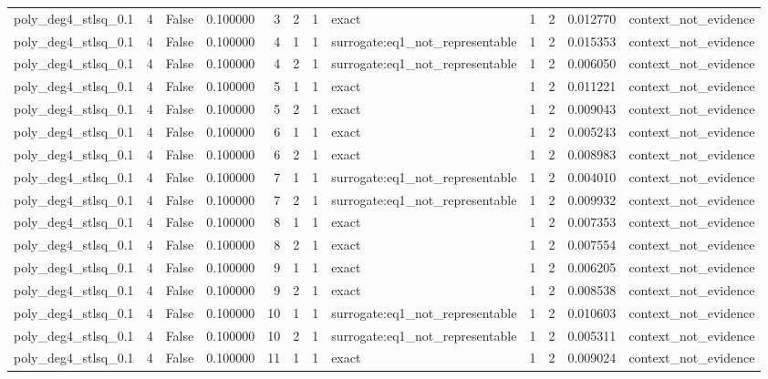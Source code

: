 \begin{tabular}{lrrrrrrlrrrl}
poly\_deg4\_stlsq\_0.1 & 4 & False & 0.100000 & 3 & 2 & 1 & exact & 1 & 2 & 0.012770 & context\_not\_evidence \\
poly\_deg4\_stlsq\_0.1 & 4 & False & 0.100000 & 4 & 1 & 1 & surrogate:eq1\_not\_representable & 1 & 2 & 0.015353 & context\_not\_evidence \\
poly\_deg4\_stlsq\_0.1 & 4 & False & 0.100000 & 4 & 2 & 1 & surrogate:eq1\_not\_representable & 1 & 2 & 0.006050 & context\_not\_evidence \\
poly\_deg4\_stlsq\_0.1 & 4 & False & 0.100000 & 5 & 1 & 1 & exact & 1 & 2 & 0.011221 & context\_not\_evidence \\
poly\_deg4\_stlsq\_0.1 & 4 & False & 0.100000 & 5 & 2 & 1 & exact & 1 & 2 & 0.009043 & context\_not\_evidence \\
poly\_deg4\_stlsq\_0.1 & 4 & False & 0.100000 & 6 & 1 & 1 & exact & 1 & 2 & 0.005243 & context\_not\_evidence \\
poly\_deg4\_stlsq\_0.1 & 4 & False & 0.100000 & 6 & 2 & 1 & exact & 1 & 2 & 0.008983 & context\_not\_evidence \\
poly\_deg4\_stlsq\_0.1 & 4 & False & 0.100000 & 7 & 1 & 1 & surrogate:eq1\_not\_representable & 1 & 2 & 0.004010 & context\_not\_evidence \\
poly\_deg4\_stlsq\_0.1 & 4 & False & 0.100000 & 7 & 2 & 1 & surrogate:eq1\_not\_representable & 1 & 2 & 0.009932 & context\_not\_evidence \\
poly\_deg4\_stlsq\_0.1 & 4 & False & 0.100000 & 8 & 1 & 1 & exact & 1 & 2 & 0.007353 & context\_not\_evidence \\
poly\_deg4\_stlsq\_0.1 & 4 & False & 0.100000 & 8 & 2 & 1 & exact & 1 & 2 & 0.007554 & context\_not\_evidence \\
poly\_deg4\_stlsq\_0.1 & 4 & False & 0.100000 & 9 & 1 & 1 & exact & 1 & 2 & 0.006205 & context\_not\_evidence \\
poly\_deg4\_stlsq\_0.1 & 4 & False & 0.100000 & 9 & 2 & 1 & exact & 1 & 2 & 0.008538 & context\_not\_evidence \\
poly\_deg4\_stlsq\_0.1 & 4 & False & 0.100000 & 10 & 1 & 1 & surrogate:eq1\_not\_representable & 1 & 2 & 0.010603 & context\_not\_evidence \\
poly\_deg4\_stlsq\_0.1 & 4 & False & 0.100000 & 10 & 2 & 1 & surrogate:eq1\_not\_representable & 1 & 2 & 0.005311 & context\_not\_evidence \\
poly\_deg4\_stlsq\_0.1 & 4 & False & 0.100000 & 11 & 1 & 1 & exact & 1 & 2 & 0.009024 & context\_not\_evidence \\

\end{tabular}
